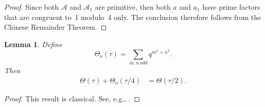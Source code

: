 \documentclass[11pt, reqno]{amsart}
\theoremstyle{plain}
\newtheorem{lemma}[theorem]{Lemma}
\theoremstyle{definition}
\numberwithin{equation}{section}
\begin{document}
\begin{proof}
    Since both $\mathcal{A}$ and $\mathcal{A}_{1}$ are primitive, then both $a$ and $a_{1}$ have prime factors that are congruent to~1 modulo~4 only. The conclusion therefore follows from the Chinese Remainder Theorem.
\end{proof}



\begin{lemma}\label{lemtheta1}
Define
$$
{\Theta}_{o}(\tau)=\sum_{m,n\,odd}q^{m^{2}+n^{2}}.
$$
Then
    \begin{align*}
  \Theta(\tau)+ {\Theta}_{o}(\tau/4)&=\Theta(\tau/2).
    \end{align*}
\end{lemma}

\begin{proof}
    This result is classical. See, e.g., \cite[Chapter~3]{C17}.
\end{proof}
\end{document}

